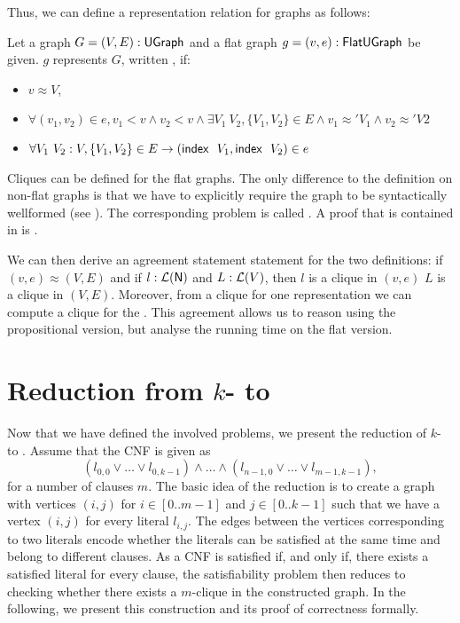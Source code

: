 Thus, we can define a representation relation for graphs as follows: 
\begin{definition}\label{def:graph_repr}
  Let a graph $G = (V, E) : \textsf{UGraph}$ and a flat graph $g = (v, e) : \textsf{FlatUGraph}$ be given. 
  $g$ represents $G$, written , if: 
  \begin{itemize}
    \item $v \approx V$, 
    \item $\forall (v_1, v_2) \in e, v_1 < v \land v_2 < v \land \exists V_1~V_2, \{V_1, V_2\} \in E \land v_1 \approx' V_1 \land v_2 \approx' V2$
    \item $\forall V_1~V_2 : V, \{V_1, V_2\} \in E \rightarrow (\textsf{index}~~V_1, \textsf{index}~~V_2) \in e$
  \end{itemize}
\end{definition}

Cliques can be defined  for the flat graphs. 
The only difference to the definition on non-flat graphs is that we have to explicitly require the graph to be syntactically wellformed (see ). 
The corresponding problem is called \mnotec[FlatClique]{\FlatClique{}}. A proof that \FlatClique{} is contained in \NP{} is .

We can then derive an agreement statement statement for the two definitions: if $(v, e) \approx (V, E)$ and if $l : \mathcal{L} (\mathsf{N})$ and $L : \mathcal{L} (V)$, then $l$ is a clique in $(v, e)$  $L$ is a clique in $(V, E)$. Moreover, from a clique for one representation we can compute a clique for the  .
This agreement allows us to reason using the propositional version, but analyse the running time on the flat version. 

\section{Reduction from $k$-\SAT{} to \Clique{}}
Now that we have defined the involved problems, we present the reduction of $k$-\SAT{} to \Clique{}. 
Assume that the CNF is given as 
\[(l_{0, 0} \lor \ldots \lor l_{0, k-1}) \land \ldots \land (l_{n-1, 0} \lor \ldots \lor l_{m-1, k-1}), \]
for a number of clauses $m$.
The basic idea of the reduction is to create a graph with vertices $(i, j)$ for $i \in [0..m-1]$ and $j \in [0..k-1]$ such that we have a vertex $(i, j)$ for every literal $l_{i, j}$. The edges between the vertices corresponding to two literals encode whether the literals can be satisfied at the same time and belong to different clauses. As a CNF is satisfied if, and only if, there exists a satisfied literal for every clause, the satisfiability problem then reduces to checking whether there exists a $m$-clique in the constructed graph. 
In the following, we present this construction and its proof of correctness formally.

